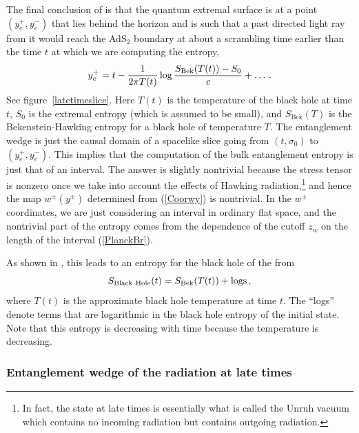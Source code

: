 \documentclass[12pt]{article}
\newcommand{\be}{\begin{equation}}
\newcommand{\ee}{\end{equation}}
\def\la{\label}
\def\nref#1{(\ref{#1})}
\begin{document}
The final conclusion of \cite{Penington:2019npb,Almheiri:2019psf} is that the quantum extremal surface is at a point $(y^+_e,y^-_e)$ that lies behind the horizon and is such that a past directed light ray from it would reach the AdS$_2$ boundary at about a scrambling time earlier than the time $t$ at which we are computing the entropy,
\begin{align}
y_e^+ = t - {1 \over 2 \pi T(t)} \log {S_{\text{Bek}}(T(t)) - S_0 \over c} + \ldots\, .
\end{align}
See figure~\ref{latetimeslice}.
Here $T(t)$ is the temperature of the black hole at time $t$, $S_0$ is the extremal entropy (which is assumed to be small), and $S_{\text{Bek}}(T)$ is the Bekenstein-Hawking entropy for a black hole of temperature $T$.
The entanglement wedge is just the causal domain of a spacelike slice going from $(t,\sigma_0)$ to $(y^+_e, y^-_e)$. 
This implies that the computation of the bulk entanglement entropy is just that of an interval.
The answer is slightly nontrivial because the stress tensor is nonzero once we take into account the effects of Hawking radiation,\footnote{In fact, the state at late times is essentially what is called the Unruh vacuum which contains no incoming radiation but contains outgoing radiation.} and hence the map $w^\pm(y^\pm)$ determined from (\ref{Coorwy}) is nontrivial. 
In the $w^\pm$ coordinates, we are just considering an interval in ordinary flat space, and the nontrivial part of the entropy comes from the dependence of the cutoff $z_w$ on the length of the interval \nref{PlanckBr}.


As shown in \cite{Penington:2019npb,Almheiri:2019psf}, 
this leads to an entropy for the black hole of the from 
\be \la{Ent}
   S_{\rm Black~ Hole} (t) = S_{\text{Bek}} (T(t) ) + {\rm logs } \, ,
\ee
where $T(t)$ is the approximate black hole temperature at time $t$.
The ``logs'' denote terms that are logarithmic in the black hole entropy of the initial state.
Note that this entropy is decreasing with time because the temperature is decreasing. 

\subsubsection{Entanglement wedge of the radiation at late times} 
  
\end{document}
